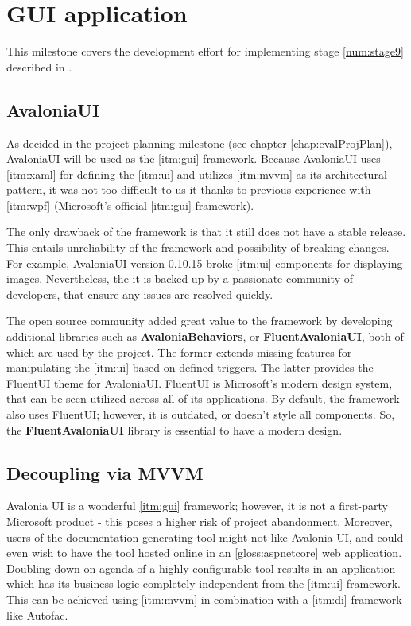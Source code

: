 \chapter{GUI application}

This milestone covers the development effort for implementing stage \ref{num:stage9} described in .

\section{AvaloniaUI}

As decided in the project planning milestone (see chapter \ref{chap:evalProjPlan}), AvaloniaUI will be used as the \ref{itm:gui} framework.
Because AvaloniaUI uses \ref{itm:xaml} for defining the \ref{itm:ui} and utilizes \ref{itm:mvvm} as its architectural pattern, it was not too difficult to us it thanks to previous experience with \ref{itm:wpf} (Microsoft's official \ref{itm:gui} framework).

The only drawback of the framework is that it still does not have a stable release. This entails unreliability of the framework and possibility of breaking changes. For example, AvaloniaUI version 0.10.15 broke \ref{itm:ui} components for displaying images. Nevertheless, the it is backed-up by a passionate community of developers, that ensure any issues are resolved quickly.

The open source community added great value to the framework by developing additional libraries such as \textbf{AvaloniaBehaviors}, or \textbf{FluentAvaloniaUI}, both of which are used by the project. The former extends missing features for manipulating the \ref{itm:ui} based on defined triggers. The latter provides the FluentUI theme for AvaloniaUI. FluentUI is Microsoft's modern design system, that can be seen utilized across all of its applications. By default, the framework also uses FluentUI; however, it is outdated, or doesn't style all components. So, the \textbf{FluentAvaloniaUI} library is essential to have a modern design.

\section{Decoupling via MVVM}

Avalonia UI is a wonderful \ref{itm:gui} framework; however, it is not a first-party Microsoft product - this poses a higher risk of project abandonment. Moreover, users of the documentation generating tool might not like Avalonia UI, and could even wish to have the tool hosted online in an \ref{gloss:aspnetcore} web application. Doubling down on agenda of a highly configurable tool results in an application which has its business logic completely independent from the \ref{itm:ui} framework.
This can be achieved using \ref{itm:mvvm} in combination with a \ref{itm:di} framework like Autofac.

